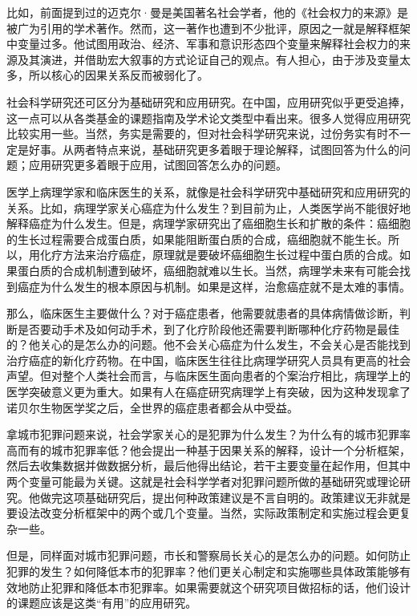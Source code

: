 比如，前面提到过的迈克尔·曼是美国著名社会学者，他的《社会权力的来源》是被广为引用的学术著作。然而，这一著作也遭到不少批评，原因之一就是解释框架中变量过多。他试图用政治、经济、军事和意识形态四个变量来解释社会权力的来源及其演进，并借助宏大叙事的方式论证自己的观点。有人担心，由于涉及变量太多，所以核心的因果关系反而被弱化了。

社会科学研究还可区分为基础研究和应用研究。在中国，应用研究似乎更受追捧，这一点可以从各类基金的课题指南及学术论文类型中看出来。很多人觉得应用研究比较实用一些。当然，务实是需要的，但对社会科学研究来说，过份务实有时不一定是好事。从两者特点来说，基础研究更多着眼于理论解释，试图回答为什么的问题；应用研究更多着眼于应用，试图回答怎么办的问题。

医学上病理学家和临床医生的关系，就像是社会科学研究中基础研究和应用研究的关系。比如，病理学家关心癌症为什么发生？到目前为止，人类医学尚不能很好地解释癌症为什么发生。但是，病理学家研究出了癌细胞生长和扩散的条件：癌细胞的生长过程需要合成蛋白质，如果能阻断蛋白质的合成，癌细胞就不能生长。所以，用化疗方法来治疗癌症，原理就是要破坏癌细胞生长过程中蛋白质的合成。如果蛋白质的合成机制遭到破坏，癌细胞就难以生长。当然，病理学未来有可能会找到癌症为什么发生的根本原因与机制。如果是这样，治愈癌症就不是太难的事情。

那么，临床医生主要做什么？对于癌症患者，他需要就患者的具体病情做诊断，判断是否要动手术及如何动手术，到了化疗阶段他还需要判断哪种化疗药物是最佳的？他关心的是怎么办的问题。他不会关心癌症为什么发生，不会关心是否能找到治疗癌症的新化疗药物。在中国，临床医生往往比病理学研究人员具有更高的社会声望。但对整个人类社会而言，与临床医生面向患者的个案治疗相比，病理学上的医学突破意义更为重大。如果有人在癌症研究病理学上有突破，因为这种发现拿了诺贝尔生物医学奖之后，全世界的癌症患者都会从中受益。

拿城市犯罪问题来说，社会学家关心的是犯罪为什么发生？为什么有的城市犯罪率高而有的城市犯罪率低？他会提出一种基于因果关系的解释，设计一个分析框架，然后去收集数据并做数据分析，最后他得出结论，若干主要变量在起作用，但其中两个变量可能最为关键。这就是社会科学学者对犯罪问题所做的基础研究或理论研究。他做完这项基础研究后，提出何种政策建议是不言自明的。政策建议无非就是要设法改变分析框架中的两个或几个变量。当然，实际政策制定和实施过程会更复杂一些。

但是，同样面对城市犯罪问题，市长和警察局长关心的是怎么办的问题。如何防止犯罪的发生？如何降低本市的犯罪率？他们更关心制定和实施哪些具体政策能够有效地防止犯罪和降低本市犯罪率。如果需要就这个研究项目做招标的话，他们设计的课题应该是这类“有用”的应用研究。

